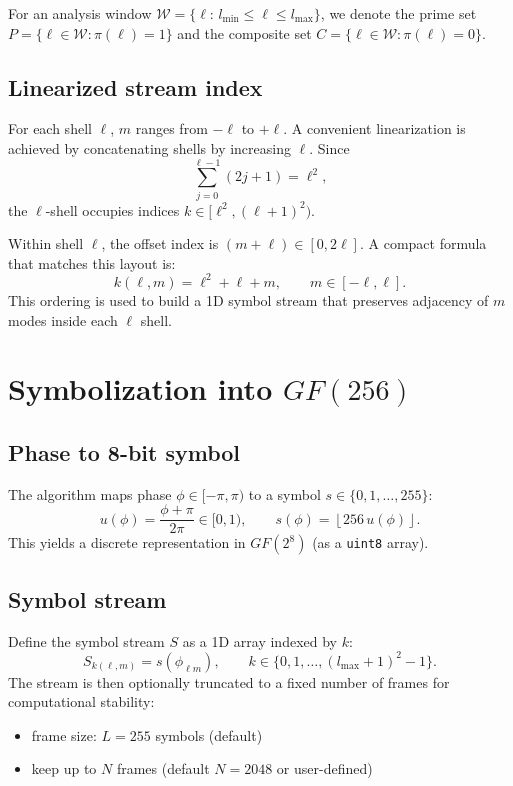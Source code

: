 \documentclass[11pt,a4paper]{article}
\begin{document}
For an analysis window $\mathcal{W}=\{\ell:\,l_{\min}\le \ell\le l_{\max}\}$,
we denote the prime set $P=\{\ell\in\mathcal{W}:\pi(\ell)=1\}$
and the composite set $C=\{\ell\in\mathcal{W}:\pi(\ell)=0\}$.

\subsection{Linearized stream index}
For each shell $\ell$, $m$ ranges from $-\ell$ to $+\ell$.
A convenient linearization is achieved by concatenating shells by increasing $\ell$.
Since
\begin{equation}
\sum_{j=0}^{\ell-1}(2j+1)=\ell^2,
\end{equation}
the $\ell$-shell occupies indices $k\in[\ell^2,(\ell+1)^2)$.

Within shell $\ell$, the offset index is $(m+\ell)\in[0,2\ell]$.
A compact formula that matches this layout is:
\begin{equation}
k(\ell,m)=\ell^2+\ell+m,\qquad m\in[-\ell,\ell].
\end{equation}
This ordering is used to build a 1D symbol stream that preserves adjacency of
$m$ modes inside each $\ell$ shell.

\section{Symbolization into $GF(256)$}

\subsection{Phase to 8-bit symbol}
The algorithm maps phase $\phi\in[-\pi,\pi)$ to a symbol $s\in\{0,1,\dots,255\}$:
\begin{equation}
u(\phi)=\frac{\phi+\pi}{2\pi}\in[0,1),\qquad
s(\phi)=\left\lfloor 256\,u(\phi)\right\rfloor.
\end{equation}
This yields a discrete representation in $GF(2^8)$ (as a \texttt{uint8} array).

\subsection{Symbol stream}
Define the symbol stream $S$ as a 1D array indexed by $k$:
\begin{equation}
S_{k(\ell,m)} = s(\phi_{\ell m}),\qquad
k\in\{0,1,\dots,(l_{\max}+1)^2-1\}.
\end{equation}
The stream is then optionally truncated to a fixed number of frames for
computational stability:
\begin{itemize}
\item frame size: $L=255$ symbols (default)
\item keep up to $N$ frames (default $N=2048$ or user-defined)
\end{itemize}
\end{document}
